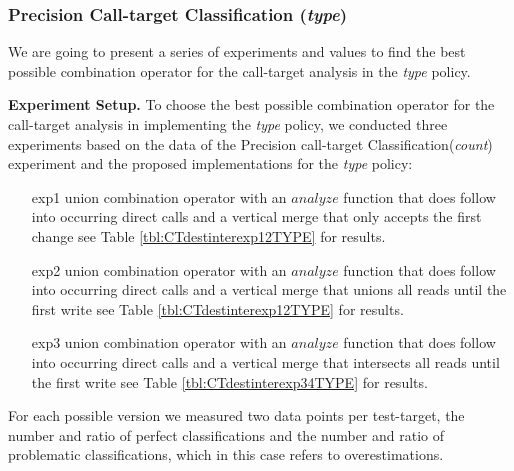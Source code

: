 %
%


\newpage
\subsubsection{Precision Call-target Classification (\textit{type})}
\label{subsection:typeshieldprecision}
We are going to present a series of experiments and values to find the best possible combination operator for the call-target analysis in the \textit{type} policy.

\textbf{Experiment Setup.}
To choose the best possible combination operator for the call-target analysis in implementing the \textit{type} policy, we conducted three experiments based on the data of the Precision call-target Classification(\textit{count}) experiment and the proposed implementations for the \textit{type} policy:
\begin{itemize}
\item[exp1] union combination operator with an $analyze$ function that does follow into occurring direct calls and a vertical merge that only accepts the first change see Table \ref{tbl:CTdestinterexp12TYPE} for results.
\item[exp2] union combination operator with an $analyze$ function that does follow into occurring direct calls  and a vertical merge that unions all reads until the first write see Table \ref{tbl:CTdestinterexp12TYPE} for results.
\item[exp3] union combination operator with an $analyze$ function that does follow into occurring direct calls  and a vertical merge that intersects all reads until the first write see Table \ref{tbl:CTdestinterexp34TYPE} for results.
\end{itemize}
For each possible version we measured two data points per test-target, the number and ratio of perfect classifications and the number and ratio of problematic classifications, which in this case refers to overestimations.

